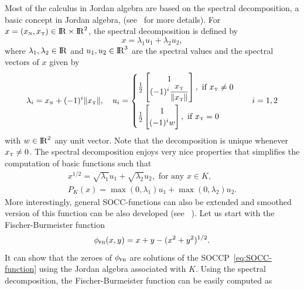 {Most of the calculus in Jordan algebra are based on the spectral decomposition, a basic concept in Jordan algebra, (see~\cite{Fukushima.ea2001} for more details).
For $x = (x_{\hbox{\tiny{N}}}, x_{\hbox{\tiny{T}}})\in \mathrm{I\!R}\times \mathrm{I\!R}^2$, the spectral decomposition is defined by
\begin{equation}
  \label{eq:Jordan-spectraldecomposition}
  x = \lambda_1 u_1 + \lambda_2 u_2,
\end{equation}
where $\lambda_1,\lambda_2\in \mathrm{I\!R}$ and $u_1,u_2\in\mathrm{I\!R}^3$ are the spectral values and the spectral vectors of $x$ given by
\begin{equation}
  \label{eq:Jordan-spectraldecomposition1}
    \lambda_i= x_\n + (-1)^i \|x_\t\|, \quad
    u_i =
    \begin{cases}
      \frac{1}{2}
      \begin{bmatrix}
        1 \\
        (-1)^i \Frac{x_\t}{\|x_\t\|}
      \end{bmatrix}, \text{ if } x_\t\neq 0 \\[5mm]
       \frac{1}{2}
      \begin{bmatrix}
        1 \\
        (-1)^i w
      \end{bmatrix}, \text{ if } x_\t = 0 \\
    \end{cases} \quad i = 1,2
\end{equation}
with $w\in\mathrm{I\!R}^2$ {any unit vector}. Note that the decomposition is unique {whenever $x_{\hbox{\tiny{T}}}\neq 0$}. The spectral decomposition enjoys very nice properties that {simplifies} the computation of basic functions such that
\begin{equation}
  \label{eq:Jordan-spectraldecomposition2}
  \begin{array}{l}
    x^{1/2} = \sqrt{\lambda_1} u_1 + \sqrt{\lambda_2} u_2, \text{ for any }  x \in K, \\[1mm]
    P_K(x) = \max(0,\lambda_1) u_1 + \max(0,\lambda_2) u_2. 
  \end{array}
\end{equation}
More interestingly,  general SOCC-functions can also be extended and smoothed version of this function can be also developed (see~\cite{Fukushima.ea2001}
). Let us start with the Fischer-Burmeister function
\begin{equation}
  \label{eq:Jordan-FB}
  \phi_{\fb}(x,y) = x+y - (x^2 + y^2 )^{1/2}.
\end{equation}
It can show that the zeroes of $\phi_{{\hbox{\tiny{\textsf FB}}}}$ are solutions of the SOCCP~\eqref{eq:SOCC-function} using the Jordan algebra associated with $K$. Using the spectral decomposition, the Fischer-Burmeister function can be easily computed as
}
